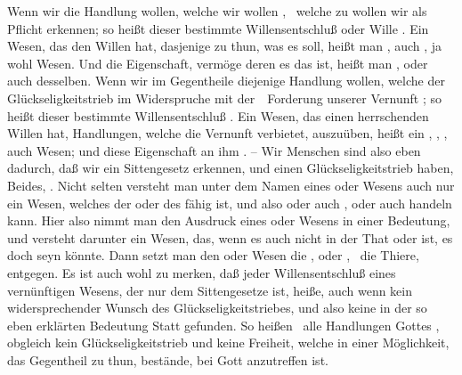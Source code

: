 \begin{aufza}
\item Wenn wir die Handlung wollen, welche wir wollen , \dh\ welche zu wollen wir als Pflicht erkennen; so heißt dieser bestimmte Willensentschluß oder Wille . Ein Wesen, das den  Willen hat, dasjenige zu thun, was es soll, heißt man , auch , ja wohl  Wesen. Und die Eigenschaft, vermöge deren es das ist, heißt man , oder auch  desselben. Wenn wir im Gegentheile diejenige Handlung wollen, welche der Glückseligkeitstrieb im Widerspruche mit der~\ Forderung unserer Vernunft ; so heißt dieser bestimmte Willensentschluß . Ein Wesen, das einen herrschenden Willen hat, Handlungen, welche die Vernunft verbietet, auszuüben, heißt ein , , , auch  Wesen; und diese Eigenschaft an ihm . -- Wir Menschen sind also eben dadurch, daß wir ein Sittengesetz erkennen, und einen Glückseligkeitstrieb haben, Beides, . Nicht selten versteht man unter dem Namen eines  oder  Wesens auch nur ein Wesen, welches der  oder des  fähig ist, und also  oder auch ,  oder auch  handeln kann. Hier also nimmt man den Ausdruck eines  oder  Wesens in einer  Bedeutung, und versteht darunter ein Wesen, das, wenn es auch nicht in der That  oder  ist, es doch seyn könnte. Dann setzt man den  oder  Wesen die ,  oder , \zB\ die Thiere, entgegen. Es ist auch wohl zu merken, daß jeder Willensentschluß eines vernünftigen Wesens, der nur dem Sittengesetze  ist,  heiße, auch wenn kein widersprechender Wunsch des Glückseligkeitstriebes, und also keine  in der so eben erklärten Bedeutung Statt gefunden. So heißen \zB\ alle Handlungen Gottes , obgleich kein Glückseligkeitstrieb und keine  Freiheit, welche in einer Möglichkeit, das Gegentheil zu thun, bestände, bei Gott anzutreffen ist.

\end{aufza}
